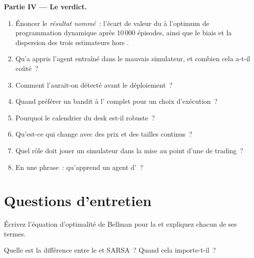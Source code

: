 \begin{problem}
\medskip\noindent\textbf{Partie IV --- Le verdict.}
\begin{enumerate}[resume]
\item Énoncer le \emph{résultat nommé}~: l'écart de valeur du  à l'optimum de programmation dynamique après 10\,000 épisodes, ainsi que le
biais et la dispersion des trois estimateurs hors .
\item Qu'a appris l'agent entraîné dans le mauvais simulateur, et combien cela a-t-il coûté~?
\item Comment l'aurait-on détecté avant le déploiement~?
\item Quand préférer un bandit à l' complet pour un choix d'exécution~?
\item Pourquoi le calendrier du desk est-il robuste~?
\item Qu'est-ce qui change avec des prix et des tailles continus~?
\item Quel rôle doit jouer un simulateur dans la mise au point d'une  de trading~?
\item En une phrase~: qu'apprend un agent d'~?
\end{enumerate}
\end{problem}

\section{Questions d'entretien}

\begin{interviewq}\label{iq:ml:reinforcement-learning-foundations:1}
Écrivez l'équation d'optimalité de Bellman pour la  et expliquez chacun de ses termes.
\end{interviewq}

\begin{interviewq}\label{iq:ml:reinforcement-learning-foundations:2}
Quelle est la différence entre le  et SARSA~? Quand cela importe-t-il~?
\end{interviewq}

